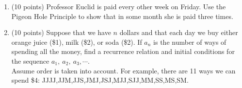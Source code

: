 {\begin{enumerate}
\begin{enumerate}\item Determine exactly how many times the print statement is executed.
\vfill
\item Determine the best Big Oh notation for the expression you found in part (a) from the following list.(Note that even if you can't get an expression for part (a), you may still be able to guess what order of magnitude it should be.)\\
$O(1), \; O( \log n), \; O(n), \; O(n \log n),\; O(n^2), \; O(n^3),
\; O(n^4), \: O(2^n) $ \vspace{1in}
\end{enumerate}
\newpage

\item (10 points) Professor Euclid is paid every other week on Friday. Use the Pigeon Hole Principle to show that in some month she is paid three times.

\vfill


\item (10 points) Suppose that we have $n$ dollars and that each day we buy either orange juice (\$1), milk (\$2), or soda (\$2). If $a_n$ is the number of ways of spending all the money, find a recurrence relation and initial conditions for the sequence $a_1, \: a_2, \: a_3, \cdots.$\\
Assume order is taken into account. For example, there are 11 ways we can spend \$4: JJJJ,JJM,JJS,JMJ,JSJ,MJJ,SJJ,MM,SS,MS,SM.\\

\vfill
\end{enumerate}
}

